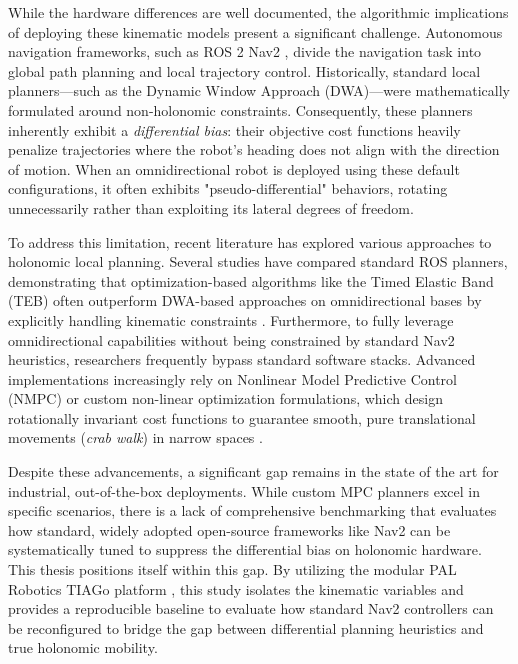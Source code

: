 While the hardware differences are well documented, the algorithmic implications of deploying these kinematic models present a significant challenge. Autonomous navigation frameworks, such as ROS 2 Nav2 \cite{macenski_marathon_2020}, divide the navigation task into global path planning and local trajectory control. Historically, standard local planners—such as the Dynamic Window Approach (DWA)—were mathematically formulated around non-holonomic constraints. Consequently, these planners inherently exhibit a \textit{differential bias}: their objective cost functions heavily penalize trajectories where the robot's heading does not align with the direction of motion. When an omnidirectional robot is deployed using these default configurations, it often exhibits "pseudo-differential" behaviors, rotating unnecessarily rather than exploiting its lateral degrees of freedom.

To address this limitation, recent literature has explored various approaches to holonomic local planning. Several studies have compared standard ROS planners, demonstrating that optimization-based algorithms like the Timed Elastic Band (TEB) often outperform DWA-based approaches on omnidirectional bases by explicitly handling kinematic constraints \cite{imamoglu2023comparison}. Furthermore, to fully leverage omnidirectional capabilities without being constrained by standard Nav2 heuristics, researchers frequently bypass standard software stacks. Advanced implementations increasingly rely on Nonlinear Model Predictive Control (NMPC) or custom non-linear optimization formulations, which design rotationally invariant cost functions to guarantee smooth, pure translational movements (\textit{crab walk}) in narrow spaces \cite{sun2022local}.

Despite these advancements, a significant gap remains in the state of the art for industrial, out-of-the-box deployments. While custom MPC planners excel in specific scenarios, there is a lack of comprehensive benchmarking that evaluates how standard, widely adopted open-source frameworks like Nav2 can be systematically tuned to suppress the differential bias on holonomic hardware. This thesis positions itself within this gap. By utilizing the modular PAL Robotics TIAGo platform \cite{pal_tiago_base, pal_tiago_omnibase}, this study isolates the kinematic variables and provides a reproducible baseline to evaluate how standard Nav2 controllers can be reconfigured to bridge the gap between differential planning heuristics and true holonomic mobility.

